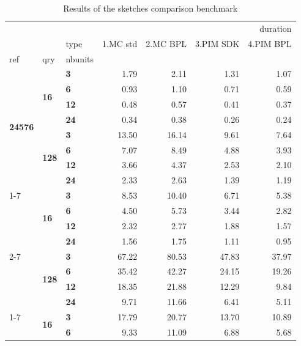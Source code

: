 \begin{table}
\caption{Results of the sketches comparison benchmark}
\label{tab:mash-results}
\begin{tabular}{lll|rr|rr}
\toprule
 &  &  & \multicolumn{4}{r}{duration} \\
 &  & type & 1.MC std & 2.MC BPL & 3.PIM SDK & 4.PIM BPL \\
ref & qry & nbunits &  &  &  &  \\
\midrule
\multirow[t]{8}{*}{\textbf{24576}} & \multirow[t]{4}{*}{\textbf{16}} & \textbf{3} & 1.79 & 2.11 & 1.31 & 1.07 \\
\textbf{} & \textbf{} & \textbf{6} & 0.93 & 1.10 & 0.71 & 0.59 \\
\textbf{} & \textbf{} & \textbf{12} & 0.48 & 0.57 & 0.41 & 0.37 \\
\textbf{} & \textbf{} & \textbf{24} & 0.34 & 0.38 & 0.26 & 0.24 \\
\cline{2-7}
\textbf{} & \multirow[t]{4}{*}{\textbf{128}} & \textbf{3} & 13.50 & 16.14 & 9.61 & 7.64 \\
\textbf{} & \textbf{} & \textbf{6} & 7.07 & 8.49 & 4.88 & 3.93 \\
\textbf{} & \textbf{} & \textbf{12} & 3.66 & 4.37 & 2.53 & 2.10 \\
\textbf{} & \textbf{} & \textbf{24} & 2.33 & 2.63 & 1.39 & 1.19 \\
\cline{1-7} \cline{2-7}
\multirow[t]{8}{*}{\textbf{122880}} & \multirow[t]{4}{*}{\textbf{16}} & \textbf{3} & 8.53 & 10.40 & 6.71 & 5.38 \\
\textbf{} & \textbf{} & \textbf{6} & 4.50 & 5.73 & 3.44 & 2.82 \\
\textbf{} & \textbf{} & \textbf{12} & 2.32 & 2.77 & 1.88 & 1.57 \\
\textbf{} & \textbf{} & \textbf{24} & 1.56 & 1.75 & 1.11 & 0.95 \\
\cline{2-7}
\textbf{} & \multirow[t]{4}{*}{\textbf{128}} & \textbf{3} & 67.22 & 80.53 & 47.83 & 37.97 \\
\textbf{} & \textbf{} & \textbf{6} & 35.42 & 42.27 & 24.15 & 19.26 \\
\textbf{} & \textbf{} & \textbf{12} & 18.35 & 21.88 & 12.29 & 9.84 \\
\textbf{} & \textbf{} & \textbf{24} & 9.71 & 11.66 & 6.41 & 5.11 \\
\cline{1-7} \cline{2-7}
\multirow[t]{8}{*}{\textbf{245760}} & \multirow[t]{4}{*}{\textbf{16}} & \textbf{3} & 17.79 & 20.77 & 13.70 & 10.89 \\
\textbf{} & \textbf{} & \textbf{6} & 9.33 & 11.09 & 6.88 & 5.68 \\

\end{tabular}
\end{table}
